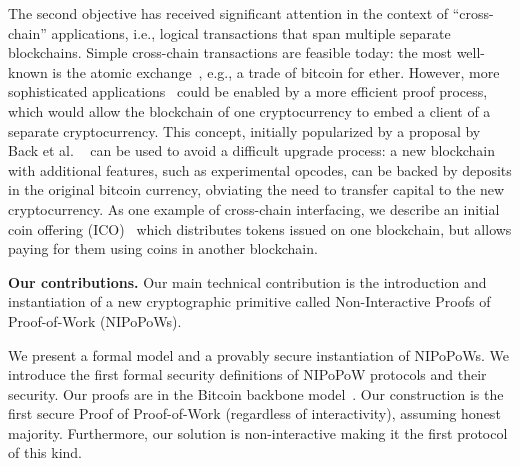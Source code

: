 %
The second objective has received  significant attention in the context of
``cross-chain'' applications, i.e., logical transactions that span multiple
separate blockchains. Simple cross-chain transactions are feasible today: the
most well-known is the atomic exchange~\cite{tiernolan,herlihy2018atomic}, e.g.,
a trade of bitcoin for ether. However, more sophisticated
applications~
\cite{interledger,DBLP:journals/corr/DilleyPWPGF16,
      lerner,drivechains,wood2016polkadot,buchman2016tendermint}
could be enabled by a more efficient proof process, which would allow the
blockchain of one cryptocurrency to embed a client of a separate cryptocurrency.
This concept, initially popularized by a proposal by Back et al.
~\cite{sidechains} can be used to avoid a difficult upgrade process: a new
blockchain with additional features, such as experimental opcodes, can be backed
by deposits in the original bitcoin currency, obviating the need to transfer
capital to the new cryptocurrency. As one example of cross-chain interfacing, we
describe an initial coin offering (ICO)~\cite{ico} which distributes tokens
issued on one blockchain, but allows paying for them using coins in another
blockchain.


\noindent
\textbf{Our contributions.}
Our main technical contribution is the introduction and instantiation of a new
cryptographic primitive called Non-Interactive Proofs of Proof-of-Work
(NIPoPoWs).

We present a formal model and a provably secure instantiation of NIPoPoWs. We
introduce the first formal security definitions of NIPoPoW protocols and their
security. Our proofs are in the Bitcoin backbone model~\cite{backbone}. Our
construction is the first secure Proof of Proof-of-Work (regardless of
interactivity), assuming honest majority. Furthermore, our solution is
non-interactive making it the first protocol of this kind.

